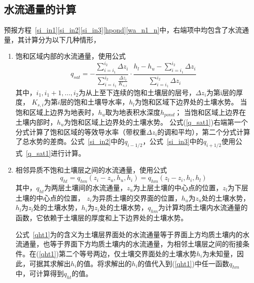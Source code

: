 \subsection{水流通量的计算}
预报方程~\eqref{si_in1}\eqref{si_in2}\eqref{si_in3}\eqref{hpond}\eqref{wa_n1_n}中，右端项中均包含了水流通量，其计算分为以下几种情形，
\begin{enumerate}
    \item 饱和区域内部的水流通量，使用公式
    \begin{equation}\label{q_sat1}
        q_{sat}=-\frac{\sum_{i=i_{1}}^{i_{2}} \Delta z_{i}}{\sum_{i=i_{1}}^{i_{2}} \frac{\Delta z_{i}}{K_{s, i}}}
         \cdot \frac{h_{l}-h_{u}-\sum_{i=i_{1}}^{i_{2}} \Delta z_{i}}{\sum_{i=i_{1}}^{i_{2}} \Delta z_{i}}
        \end{equation}
        其中，$i_1,i_1+1,…,i_2$为从上至下连续的饱和土壤层的层号，$\Delta z_i$为第i层的厚度，
        $K_{s,i}$为第$i$层的饱和土壤导水率，$h_l$为饱和区域下边界处的土壤水势。
        当饱和区域上边界为地表时，$h_u$取为地表积水深度$h_{pond}$；
        当饱和区域上边界在土壤内部时，$h_u$为饱和区域上边界处的土壤水势。
        公式(\ref{q_sat1})右端第一个分式计算了饱和区域的等效导水率（带权重$\Delta z_i$的调和平均），第二个分式计算了总水势的差商。公式~\eqref{si_in2}中的$q_{i-1/2}$，公式~\eqref{si_in3}中的$q_{i+1/2}$使用公式~\eqref{q_sat1}进行计算。

    \item 相邻异质不饱和土壤层之间的水流通量，使用公式
    \begin{equation}\label{qht1}
        q_{h t}=q_{h m}\left(z_{i}-z_{u}, h_{u}, h_{i}\right)=q_{h m}\left(z_{l}-z_{i}, h_{i}, h_{l}\right)
        \end{equation}
        其中，$q_{ht}$为两层土壤间的水流通量，$z_u$为上层土壤的中心点的位置，$z_l$为下层土壤的中心点的位置，
        $z_i$为异质土壤的交界面的位置，$h_u$为$z_u$处的土壤水势，$h_l$为$z_l$处的土壤水势，$h_i$为$z_i$处的土壤水势，$q_{hm}$为计算均质土壤内水流通量的函数，它依赖于土壤层的厚度和上下边界处的土壤水势。
        
        公式~\eqref{qht1}为的含义为土壤层界面处的水流通量等于界面上方均质土壤内的水流通量，也等于界面下方均质土壤内的水流通量，为相邻土壤层之间的衔接条件。在(\ref{qht1})第二个等号两边，仅土壤交界面处的土壤水势$h_i$为未知量，因此，可据其求解出$h_i$的值。将求解出的$h_i$的值代入到(\ref{qht1})中任一函数$q_{hm}$中，可计算得到$q_{ht}$的值。
        

\end{enumerate}
